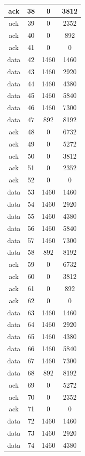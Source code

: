 \documentclass[a4paper,11pt,final]{report}
\begin{document}
\begin{longtable}{|c|c|c|c|}
ack & 38 & 0 & 3812 \\ \hline
ack & 39 & 0 & 2352 \\ \hline
ack & 40 & 0 & 892 \\ \hline
ack & 41 & 0 & 0 \\ \hline
data & 42 & 1460 & 1460 \\ \hline
data & 43 & 1460 & 2920 \\ \hline
data & 44 & 1460 & 4380 \\ \hline
data & 45 & 1460 & 5840 \\ \hline
data & 46 & 1460 & 7300 \\ \hline
data & 47 & 892 & 8192 \\ \hline
ack & 48 & 0 & 6732 \\ \hline
ack & 49 & 0 & 5272 \\ \hline
ack & 50 & 0 & 3812 \\ \hline
ack & 51 & 0 & 2352 \\ \hline
ack & 52 & 0 & 0 \\ \hline
data & 53 & 1460 & 1460 \\ \hline
data & 54 & 1460 & 2920 \\ \hline
data & 55 & 1460 & 4380 \\ \hline
data & 56 & 1460 & 5840 \\ \hline
data & 57 & 1460 & 7300 \\ \hline
data & 58 & 892 & 8192 \\ \hline
ack & 59 & 0 & 6732 \\ \hline
ack & 60 & 0 & 3812 \\ \hline
ack & 61 & 0 & 892 \\ \hline
ack & 62 & 0 & 0 \\ \hline
data & 63 & 1460 & 1460 \\ \hline
data & 64 & 1460 & 2920 \\ \hline
data & 65 & 1460 & 4380 \\ \hline
data & 66 & 1460 & 5840 \\ \hline
data & 67 & 1460 & 7300 \\ \hline
data & 68 & 892 & 8192 \\ \hline
ack & 69 & 0 & 5272 \\ \hline
ack & 70 & 0 & 2352 \\ \hline
ack & 71 & 0 & 0 \\ \hline
data & 72 & 1460 & 1460 \\ \hline
data & 73 & 1460 & 2920 \\ \hline
data & 74 & 1460 & 4380 \\ \hline

\end{longtable}
\end{document}

